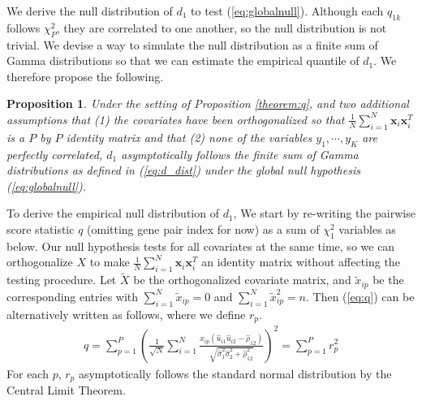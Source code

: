 \documentclass[aap,authoryear, preprint]{imsart}
\numberwithin{equation}{section}
\theoremstyle{plain}
\newtheorem{prop}{Proposition}
\begin{document}
We derive the null distribution of $d_1$ to test (\ref{eq:globalnull}). Although each ${q}_{1k}$ follows $\chi_{P}^2$, they are correlated to one another, so the null distribution is not trivial. We devise a way to simulate the null distribution as a finite sum of Gamma distributions so that we can estimate the empirical quantile of $d_1$. We therefore propose the following.

\begin{prop}
Under the setting of Proposition \ref{theorem:q}, and two additional assumptions that (1) the covariates have been orthogonalized so that 
$\frac{1}{N} \sum_{i=1}^{N} \bm{x}_i \bm{x}_i^T$ is a $P$ by $P$ identity matrix and that (2) none of the variables $y_1, \cdots, y_K$ are perfectly correlated, $d_1$ asymptotically follows the finite sum of Gamma distributions as defined in (\ref{eq:d_dist}) under the global null hypothesis (\ref{eq:globalnull}). 
\end{prop}

To derive the empirical null distribution of $d_1$, We start by re-writing the pairwise score statistic $q$ (omitting gene pair index for now) as a sum of $\chi_1^2$ variables as below. Our null hypothesis tests for all covariates at the same time, so we can orthogonalize $X$ to make $\frac{1}{N} \sum_{i=1}^{N} \bm{x}_i \bm{x}_i^T$ an identity matrix without affecting the testing procedure. Let $\tilde{X}$ be the orthogonalized covariate matrix, and $\tilde{x}_{ip}$ be the corresponding entries with $\sum_{i=1}^{N}\tilde{x}_{ip} = 0$ and $\sum_{i=1}^{N} \tilde{x}_{ip}^2  = n$. Then (\ref{eq:q}) can be alternatively written as follows, where we define $r_{p}.$
\begin{align}
q = \sum_{p=1}^{P}
 \left(\frac{1}{\sqrt{N}}
 \sum_{i=1}^{N} \frac{x_{ip} \left(\hat{u}_{i1}\hat{u}_{i2} - \hat{\rho}_{12} \right)}{\sqrt{\hat{\sigma}_{1}^2\hat{\sigma}_{2}^2 + \hat{\rho}_{12}^2}}
\right)^2 = \sum_{p=1}^{P}r_p^2
\label{eq:r}
\end{align}
For each $p$, $r_p$ asymptotically follows the standard normal distribution by the Central Limit Theorem. \\
\end{document}
